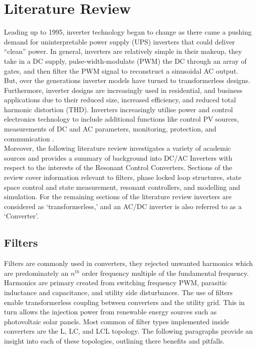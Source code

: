 \chapter{Literature Review}
Leading up to 1995, inverter technology began to change as there came a pushing demand for uninterpretable power supply (UPS) inverters that could deliver ``clean'' power. In general, inverters are relatively simple in their makeup, they take in a DC supply, pulse-width-modulate (PWM) the DC through an array of gates, and then filter the PWM signal to reconstruct a sinusoidal AC output. But, over the generations inverter models have turned to transformerless designs.\\ 
Furthermore, inverter designs are increasingly used in residential, and business applications due to their reduced size, increased efficiency, and reduced total harmonic distortion (THD). Inverters increasingly utilise power and control electronics technology to include additional functions like control PV sources, measurements of DC and AC parameters, monitoring, protection, and communication \cite{474857,5730644}.\\
Moreover, the following literature review investigates a variety of academic sources and provides a summary of background into DC/AC Inverters with respect to the interests of the Resonant Control Converters. Sections of the review cover information relevant to filters, phase locked loop structures, state space control and state measurement, resonant controllers, and modelling and simulation. For the remaining sections of the literature review inverters are considered as `transformerless,' and an AC/DC inverter is also referred to as a `Converter'.
\section{Filters}
Filters are commonly used in converters, they rejected unwanted harmonics which are predominately an $n^{th}$ order frequency multiple of the fundamental frequency. Harmonics are primary created from switching frequency PWM, parasitic inductance and capacitance, and utility side disturbances. The use of filters enable transformerless coupling between converters and the utility grid. This in turn allows the injection power from renewable energy sources such as photovoltaic solar panels. Most common of filter types implemented inside converters are the L, LC, and LCL topology. The following paragraphs provide an insight into each of these topologies, outlining there benefits and pitfalls.
%

